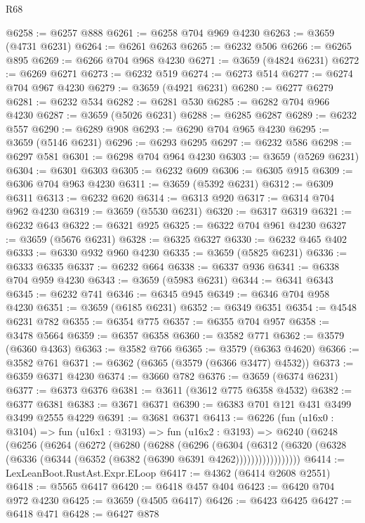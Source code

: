 \begin{lexlean}{R68}
\begin{coremodule}
@6258 := @6257 @888
@6261 := @6258 @704 @969 @4230
@6263 := @3659 (@4731 @6231)
@6264 := @6261 @6263
@6265 := @6232 @506
@6266 := @6265 @895
@6269 := @6266 @704 @968 @4230
@6271 := @3659 (@4824 @6231)
@6272 := @6269 @6271
@6273 := @6232 @519
@6274 := @6273 @514
@6277 := @6274 @704 @967 @4230
@6279 := @3659 (@4921 @6231)
@6280 := @6277 @6279
@6281 := @6232 @534
@6282 := @6281 @530
@6285 := @6282 @704 @966 @4230
@6287 := @3659 (@5026 @6231)
@6288 := @6285 @6287
@6289 := @6232 @557
@6290 := @6289 @908
@6293 := @6290 @704 @965 @4230
@6295 := @3659 (@5146 @6231)
@6296 := @6293 @6295
@6297 := @6232 @586
@6298 := @6297 @581
@6301 := @6298 @704 @964 @4230
@6303 := @3659 (@5269 @6231)
@6304 := @6301 @6303
@6305 := @6232 @609
@6306 := @6305 @915
@6309 := @6306 @704 @963 @4230
@6311 := @3659 (@5392 @6231)
@6312 := @6309 @6311
@6313 := @6232 @620
@6314 := @6313 @920
@6317 := @6314 @704 @962 @4230
@6319 := @3659 (@5530 @6231)
@6320 := @6317 @6319
@6321 := @6232 @643
@6322 := @6321 @925
@6325 := @6322 @704 @961 @4230
@6327 := @3659 (@5676 @6231)
@6328 := @6325 @6327
@6330 := @6232 @465 @402
@6333 := @6330 @932 @960 @4230
@6335 := @3659 (@5825 @6231)
@6336 := @6333 @6335
@6337 := @6232 @664
@6338 := @6337 @936
@6341 := @6338 @704 @959 @4230
@6343 := @3659 (@5983 @6231)
@6344 := @6341 @6343
@6345 := @6232 @741
@6346 := @6345 @945
@6349 := @6346 @704 @958 @4230
@6351 := @3659 (@6185 @6231)
@6352 := @6349 @6351
@6354 := @4548 @6231 @782
@6355 := @6354 @775
@6357 := @6355 @704 @957
@6358 := @3478 @5664
@6359 := @6357 @6358
@6360 := @3582 @771
@6362 := @3579 (@6360 @4363)
@6363 := @3582 @766
@6365 := @3579 (@6363 @4620)
@6366 := @3582 @761
@6371 := @6362 (@6365 (@3579 (@6366 @3477) @4532))
@6373 := @6359 @6371 @4230
@6374 := @3660 @782
@6376 := @3659 (@6374 @6231)
@6377 := @6373 @6376
@6381 := @3611 (@3612 @775 @6358 @4532)
@6382 := @6377 @6381
@6383 := @3671 @6371
@6390 := @6383 @701 @121 @431 @3499 @3499 @2555 @4229
@6391 := @3681 @6371
@6413 := @6226
    (fun (u16x0 : @3104) =>
    fun (u16x1 : @3193) =>
    fun (u16x2 : @3193) =>
    @6240
      (@6248
        (@6256
          (@6264
            (@6272
              (@6280
                (@6288
                  (@6296
                    (@6304
                      (@6312
                        (@6320
                          (@6328 (@6336 (@6344 (@6352 (@6382 (@6390 @6391 @4262)))))))))))))))))
@6414 := LexLeanBoot.RustAst.Expr.ELoop
@6417 := @4362 (@6414 @2608 @2551)
@6418 := @5565 @6417
@6420 := @6418 @457 @404
@6423 := @6420 @704 @972 @4230
@6425 := @3659 (@4505 @6417)
@6426 := @6423 @6425
@6427 := @6418 @471
@6428 := @6427 @878

\end{coremodule}
\end{lexlean}
